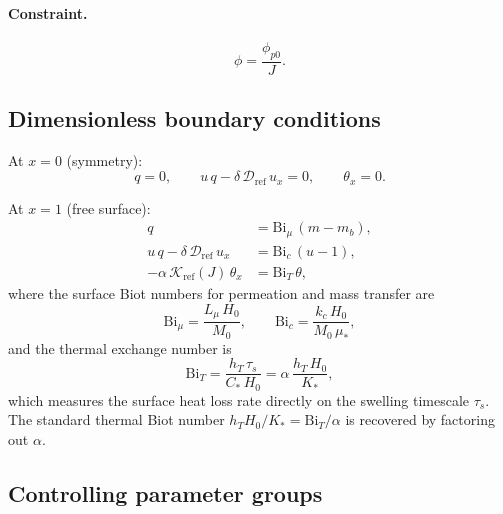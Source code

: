 \documentclass[11pt]{article}
\newcommand{\Ds}{\mathcal{D}}
\newcommand{\Ks}{\mathcal{K}}
\newcommand{\Bi}{\mathrm{Bi}}
\newcommand{\pp}{\phi_{p0}}
\begin{document}
\paragraph{Constraint.}
\begin{equation}
  \phi = \frac{\pp}{J}.
\end{equation}

\subsection{Dimensionless boundary conditions}

At $x=0$ (symmetry):
\begin{equation}
  q = 0, \qquad
  u\,q - \delta\,\Ds_\mathrm{ref}\,u_x = 0, \qquad
  \theta_x = 0.
  \label{eq:bc0_nondim}
\end{equation}

At $x=1$ (free surface):
\begin{align}
  q &= \Bi_\mu\,(m - m_b), \label{eq:bc1_mu} \\
  u\,q - \delta\,\Ds_\mathrm{ref}\,u_x &= \Bi_c\,(u - 1), \label{eq:bc1_c} \\
  -\alpha\,\Ks_\mathrm{ref}(J)\,\theta_x &= \Bi_T\,\theta, \label{eq:bc1_T}
\end{align}
where the surface Biot numbers for permeation and mass transfer are
\begin{equation}
  \Bi_\mu = \frac{L_\mu\,H_0}{M_0},
  \qquad
  \Bi_c = \frac{k_c\,H_0}{M_0\,\mu_*},
  \label{eq:Bi_mu_c}
\end{equation}
and the thermal exchange number is
\begin{equation}
  \Bi_T = \frac{h_T\,\tau_s}{C_*\,H_0}
  = \alpha\,\frac{h_T\,H_0}{K_*},
  \label{eq:Bi_T}
\end{equation}
which measures the surface heat loss rate directly on the swelling
timescale $\tau_s$.  The standard thermal Biot number
$h_T H_0/K_*=\Bi_T/\alpha$ is recovered by factoring out $\alpha$.

\subsection{Controlling parameter groups}
\end{document}
